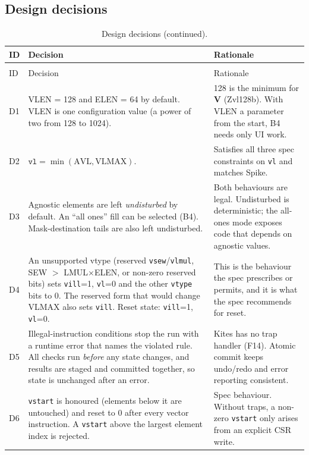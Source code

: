 \documentclass[11pt]{article}
\begin{document}
\subsection{Design decisions}\label{sec:decisions}

\small
\begin{longtable}{@{}L{0.8cm}L{6.4cm}L{7.9cm}@{}}
\caption{Design decisions.}\label{tab:decisions}\\
\toprule
ID & Decision & Rationale \\
\midrule
\endfirsthead
\caption[]{Design decisions (continued).}\\
\toprule
ID & Decision & Rationale \\
\midrule
\endhead
D1 & VLEN = 128 and ELEN = 64 by default. VLEN is one configuration value (a power of two from 128 to 1024). & 128 is the minimum for \textbf{V} (Zvl128b). With VLEN a parameter from the start, B4 needs only UI work. \\
D2 & $\texttt{vl} = \min(\mathrm{AVL}, \mathrm{VLMAX})$. & Satisfies all three spec constraints on \texttt{vl} and matches Spike. \\
D3 & Agnostic elements are left \emph{undisturbed} by default. An ``all ones'' fill can be selected (B4). Mask-destination tails are also left undisturbed. & Both behaviours are legal. Undisturbed is deterministic; the all-ones mode exposes code that depends on agnostic values. \\
D4 & An unsupported vtype (reserved \texttt{vsew}/\texttt{vlmul}, SEW $>$ LMUL$\times$ELEN, or non-zero reserved bits) sets \texttt{vill}=1, \texttt{vl}=0 and the other \texttt{vtype} bits to 0. The reserved form  that would change VLMAX also sets \texttt{vill}. Reset state: \texttt{vill}=1, \texttt{vl}=0. & This is the behaviour the spec prescribes or permits, and it is what the spec recommends for reset. \\
D5 & Illegal-instruction conditions stop the run with a runtime error that names the violated rule. All checks run \emph{before} any state changes, and results are staged and committed together, so state is unchanged after an error. & Kites has no trap handler (F14). Atomic commit keeps undo/redo and error reporting consistent. \\
D6 & \texttt{vstart} is honoured (elements below it are untouched) and reset to 0 after every vector instruction. A \texttt{vstart} above the largest element index is rejected. & Spec behaviour. Without traps, a non-zero \texttt{vstart} only arises from an explicit CSR write. \\

\end{longtable}
\end{document}

